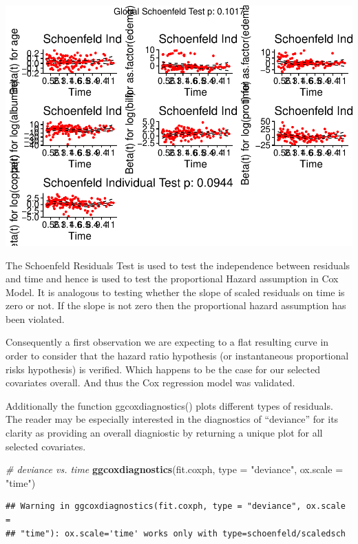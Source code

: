 \documentclass[]{article}
\newenvironment{Shaded}{\begin{snugshade}}{\end{snugshade}}
\newcommand{\KeywordTok}[1]{\textcolor[rgb]{0.13,0.29,0.53}{\textbf{#1}}}
\newcommand{\DataTypeTok}[1]{\textcolor[rgb]{0.13,0.29,0.53}{#1}}
\newcommand{\StringTok}[1]{\textcolor[rgb]{0.31,0.60,0.02}{#1}}
\newcommand{\CommentTok}[1]{\textcolor[rgb]{0.56,0.35,0.01}{\textit{#1}}}
\newcommand{\NormalTok}[1]{#1}
\begin{document}
\includegraphics{report_files/figure-latex/unnamed-chunk-23-1.pdf}

The Schoenfeld Residuals Test is used to test the independence between
residuals and time and hence is used to test the proportional Hazard
assumption in Cox Model. It is analogous to testing whether the slope of
scaled residuals on time is zero or not. If the slope is not zero then
the proportional hazard assumption has been violated.

Consequently a first observation we are expecting to a flat resulting
curve in order to consider that the hazard ratio hypothesis (or
instantaneous proportional risks hypothesis) is verified. Which happens
to be the case for our selected covariates overall. And thus the Cox
regression model was validated.

Additionally the function ggcoxdiagnostics() plots different types of
residuals. The reader may be especially interested in the diagnostics of
``deviance'' for its clarity as providing an overall diagniostic by
returning a unique plot for all selected covariates.

\begin{Shaded}
\begin{Highlighting}[]
\CommentTok{# deviance vs. time}
\KeywordTok{ggcoxdiagnostics}\NormalTok{(fit.coxph,}
                 \DataTypeTok{type =} \StringTok{"deviance"}\NormalTok{,}
                 \DataTypeTok{ox.scale =} \StringTok{"time"}\NormalTok{)}
\end{Highlighting}
\end{Shaded}

\begin{verbatim}
## Warning in ggcoxdiagnostics(fit.coxph, type = "deviance", ox.scale =
## "time"): ox.scale='time' works only with type=schoenfeld/scaledsch
\end{verbatim}
\end{document}
